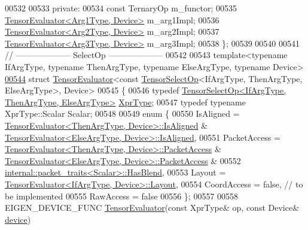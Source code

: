 \begin{DoxyCode}
00532 
00533  \textcolor{keyword}{private}:
00534   \textcolor{keyword}{const} TernaryOp m\_functor;
00535   \hyperlink{struct_eigen_1_1_tensor_evaluator}{TensorEvaluator<Arg1Type, Device>} m\_arg1Impl;
00536   \hyperlink{struct_eigen_1_1_tensor_evaluator}{TensorEvaluator<Arg2Type, Device>} m\_arg2Impl;
00537   \hyperlink{struct_eigen_1_1_tensor_evaluator}{TensorEvaluator<Arg3Type, Device>} m\_arg3Impl;
00538 \};
00539 
00540 
00541 \textcolor{comment}{// -------------------- SelectOp --------------------}
00542 
00543 \textcolor{keyword}{template}<\textcolor{keyword}{typename} IfArgType, \textcolor{keyword}{typename} ThenArgType, \textcolor{keyword}{typename} ElseArgType, \textcolor{keyword}{typename} Device>
\hyperlink{struct_eigen_1_1_tensor_evaluator_3_01const_01_tensor_select_op_3_01_if_arg_type_00_01_then_arg_346b931156fad56ae8aa875afe41cb55}{00544} \textcolor{keyword}{struct }\hyperlink{struct_eigen_1_1_tensor_evaluator}{TensorEvaluator}<const \hyperlink{class_eigen_1_1_tensor_select_op}{TensorSelectOp}<IfArgType, ThenArgType, 
      ElseArgType>, Device>
00545 \{
00546   \textcolor{keyword}{typedef} \hyperlink{class_eigen_1_1_tensor_select_op}{TensorSelectOp<IfArgType, ThenArgType, ElseArgType>}
       \hyperlink{class_eigen_1_1_tensor_select_op}{XprType};
00547   \textcolor{keyword}{typedef} \textcolor{keyword}{typename} XprType::Scalar Scalar;
00548 
00549   \textcolor{keyword}{enum} \{
00550     IsAligned = \hyperlink{struct_eigen_1_1_tensor_evaluator}{TensorEvaluator<ThenArgType, Device>::IsAligned}
       & \hyperlink{struct_eigen_1_1_tensor_evaluator}{TensorEvaluator<ElseArgType, Device>::IsAligned},
00551     PacketAccess = \hyperlink{struct_eigen_1_1_tensor_evaluator}{TensorEvaluator<ThenArgType, Device>::PacketAccess}
       & \hyperlink{struct_eigen_1_1_tensor_evaluator}{TensorEvaluator<ElseArgType, Device>::PacketAccess} &
00552                    \hyperlink{struct_eigen_1_1internal_1_1packet__traits}{internal::packet\_traits<Scalar>::HasBlend},
00553     Layout = \hyperlink{struct_eigen_1_1_tensor_evaluator}{TensorEvaluator<IfArgType, Device>::Layout},
00554     CoordAccess = \textcolor{keyword}{false},  \textcolor{comment}{// to be implemented}
00555     RawAccess = \textcolor{keyword}{false}
00556   \};
00557 
00558   EIGEN\_DEVICE\_FUNC \hyperlink{struct_eigen_1_1_tensor_evaluator}{TensorEvaluator}(\textcolor{keyword}{const} XprType& op, \textcolor{keyword}{const} Device& 
      \hyperlink{struct_eigen_1_1_tensor_evaluator_a98b51809ed8f7a1f736eb7b952b9636e}{device})

\end{DoxyCode}
